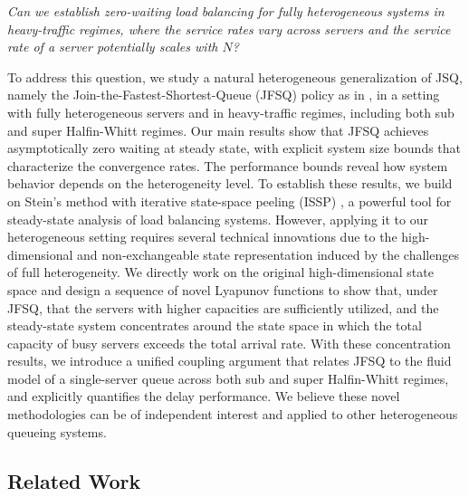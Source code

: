 \documentclass[11pt,oneside,letter]{article}
\begin{document}
\vspace{3pt}
{\it Can we establish zero-waiting load balancing for fully heterogeneous systems in heavy-traffic regimes, where the service rates vary across servers and the service rate of a server potentially scales with $N$?}
\vspace{3pt}

To address this question, we study a natural heterogeneous generalization of JSQ, namely the Join-the-Fastest-Shortest-Queue (JFSQ) policy as in \cite{WenZhoSri_20, BhaBukMuk_25}, in a setting with fully heterogeneous servers and in heavy-traffic regimes, including both sub and super Halfin-Whitt regimes. Our main results show that JFSQ achieves asymptotically zero waiting at steady state, with explicit system size bounds that characterize the convergence rates. The performance bounds reveal how system behavior depends on the heterogeneity level.  
To establish these results, we build on Stein’s method with iterative state-space peeling (ISSP) \cite{LiuYin_20, LiuKanYin_22, LiuKanYin_24}, a powerful tool for steady-state analysis of load balancing systems. However, applying it to our heterogeneous setting requires several technical innovations due to the high-dimensional and non-exchangeable state representation induced by the challenges of full heterogeneity. We directly work on the original high-dimensional state space and design a sequence of novel Lyapunov functions to show that, under JFSQ, that the servers with higher capacities are sufficiently utilized, and the steady-state system concentrates around the state space in which the total capacity of busy servers exceeds the total arrival rate. 
With these concentration results, we introduce a unified coupling argument that relates JFSQ to the fluid model of a single-server queue across both sub and super Halfin-Whitt regimes, and explicitly quantifies the delay performance. We believe these novel methodologies can be of independent interest and applied to other heterogeneous queueing systems.	  


\subsection*{Related Work}
\end{document}
